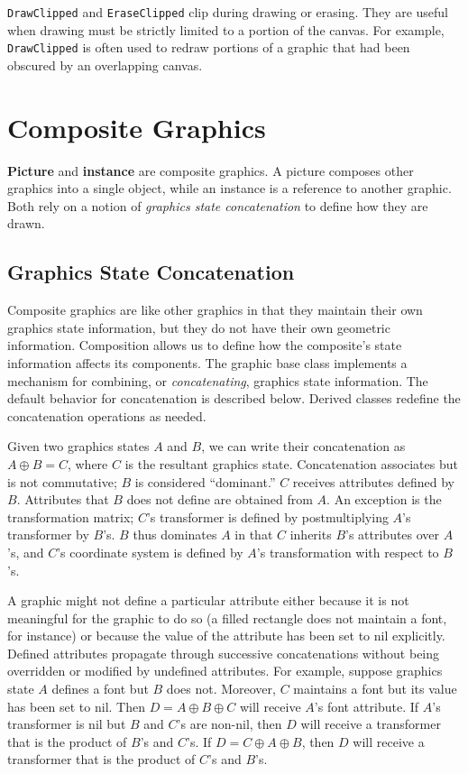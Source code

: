 {\tt DrawClipped} and {\tt EraseClipped} clip during drawing or erasing.
They are useful when drawing must be strictly limited to a portion of the
canvas.  For example, {\tt DrawClipped} is often used to redraw portions of
a graphic that had been obscured by an overlapping canvas.

\section{Composite Graphics}

{\bf Picture} and {\bf instance} are composite graphics.  A picture
composes other graphics into a single object, while an instance is a
reference to another graphic.  Both rely on a notion of {\em graphics state
concatenation} to define how they are drawn.

\subsection{Graphics State Concatenation}

Composite graphics are like other graphics in that they maintain their
own graphics state information, but they do not have their own
geometric information.
Composition allows us to define how the
composite's state information affects its components.  The graphic base class
implements a mechanism for combining, or {\em concatenating}, graphics
state information.  
The default behavior for
concatenation is described below.
Derived classes redefine the concatenation operations as needed.

Given two graphics states $A$ and $B$, we can write their concatenation as
$A \oplus B = C$, where $C$ is the resultant graphics state.  Concatenation
associates but is not commutative; $B$ is considered ``dominant.'' $C$
receives attributes defined by $B$.  Attributes that $B$ does not define are
obtained from $A$.  An exception is the transformation matrix; $C$'s
transformer is defined by postmultiplying $A$'s transformer by $B$'s.  $B$
thus dominates $A$ in that $C$ inherits $B$'s attributes over $A$'s, and
$C$'s coordinate system is defined by $A$'s transformation with respect to
$B$'s.  

A graphic might not define a particular attribute either because it
is not meaningful for the graphic to do so (a filled rectangle does not
maintain a font, for instance) or because the value of the attribute has
been set to nil explicitly.
Defined attributes propagate through successive concatenations without being
overridden or modified by undefined attributes.  For example, suppose
graphics state $A$ defines a font but $B$ does not.  Moreover, $C$ maintains
a font but its value has been set to nil.  Then $D = A \oplus B \oplus C$
will receive $A$'s font attribute.  If $A$'s transformer is nil but $B$ and
$C$'s are non-nil, then $D$ will receive a transformer that is the product
of $B$'s and $C$'s.  If $D = C \oplus A \oplus B$, then $D$ will receive a
transformer that is the product of $C$'s and $B$'s.

